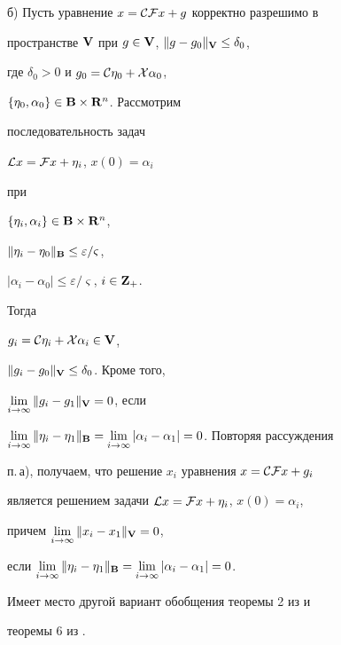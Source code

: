 \begin{pf}
\smallskip





б) Пусть уравнение $x={\cal C}{\cal F}x+g$ корректно разрешимо в


пространстве $\bold {V}$ при $g\in\bold {V}$, $\|g-g_0\|_{\bold V}\le\delta_0$,


где $\delta_0>0$ и $g_0={\cal C}\eta_0+{\cal X}\alpha_0$,


$\{\eta_0,\alpha_0\}\in\bold {B}\times\bold {R}^n$. Рассмотрим


последовательность задач


${\cal L}x={\cal F}x+\eta_i$, $x(0)=\alpha_i$


при


$\{\eta_i,\alpha_i\}\in\bold {B}\times\bold {R}^n$,


$\|\eta_i-\eta_0\|_{\bold B}\le\varepsilon/\varsigma$,


$|\alpha_i-\alpha_0|\le\varepsilon/\varsigma$, $i\in\bold {Z}_+$.


Тогда


$g_i={\cal C}\eta_i+{\cal X}\alpha_i\in\bold {V}$,


$\|g_i-g_0\|_{\bold V}\le\delta_0$. Кроме того,


$\lim\limits_{i\to\infty}\|g_i-g_1\|_{\bold V}=0$, если


$\lim\limits_{i\to\infty}\|\eta_i-\eta_1\|_{\bold B}=


\lim\limits_{i\to\infty}|\alpha_i-\alpha_1|=0$. Повторяя рассуждения


п.\,а), получаем, что решение $x_i$ уравнения $x={\cal C}{\cal F}x+g_i$


является решением задачи ${\cal L}x={\cal F}x+\eta_i$, $x(0)=\alpha_i$,


причем $\lim\limits_{i\to\infty}\|x_i-x_1\|_{\bold V}=0$,


если $\lim\limits_{i\to\infty}\|\eta_i-\eta_1\|_{\bold B}=


\lim\limits_{i\to\infty}|\alpha_i-\alpha_1|=0$.


\end{pf}





Имеет место другой вариант обобщения теоремы 2 из \cite{7} и


теоремы 6 из \cite{9}.





